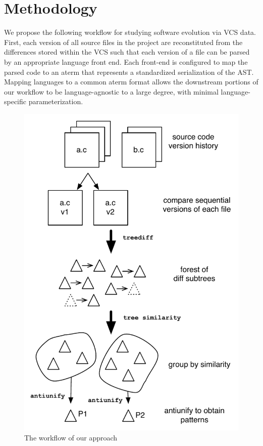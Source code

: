 
\section{Methodology}
\label{sec:method}

We propose the following workflow for studying software evolution via VCS data.
First, each version of all source files in the project are reconstituted from
the differences stored within the VCS such that each version of a file can be
parsed by an appropriate language front end.  Each front-end is configured to
map the parsed code to an aterm that represents a standardized serialization of
the AST\@.  Mapping languages to a common aterm format allows the downstream
portions of our workflow to be language-agnostic to a large degree, with
minimal language-specific parameterization.

\begin{figure}
\begin{center}
\includegraphics[height=0.44\textheight]{figures/workflow.pdf}
\caption{The workflow of our approach}
\label{fig:workflow}
\end{center}
\end{figure}

